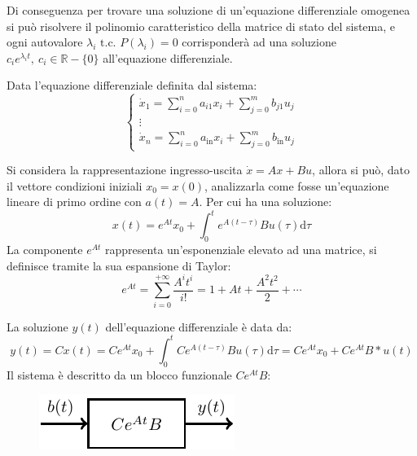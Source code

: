 \documentclass{article}
\numberwithin{equation}{subsection}
\newcommand{\df}{\mathrm{d}}
\begin{document}
Di conseguenza per trovare una soluzione di un'equazione differenziale omogenea si può risolvere il polinomio caratteristico della matrice di stato del sistema, e ogni 
autovalore $\lambda_i\mbox{ t.c. }P(\lambda_i)=0$ corrisponderà ad una soluzione $c_ie^{\lambda_it},\:c_i\in\mathbb{R}-\{0\}$ all'equazione differenziale. 


Data l'equazione differenziale definita dal sistema:
\begin{equation*}
    \begin{cases}
        \dot x_1=\displaystyle\sum_{i=0}^na_{i1}x_i+\sum_{j=0}^mb_{j1}u_j\\
        \vdots\\
        \dot x_n=\displaystyle\sum_{i=0}^na_\mathrm{in}x_i+\sum_{j=0}^mb_\mathrm{in}u_j
    \end{cases}
\end{equation*}

Si considera la rappresentazione ingresso-uscita $\dot x=Ax+Bu$, allora si può, dato il vettore condizioni iniziali $x_0=x(0)$, analizzarla come fosse un'equazione lineare 
di primo ordine con $a(t)=A$. Per cui ha una soluzione:
\begin{equation*}
    x(t)=e^{At}x_0+\displaystyle\int_{0}^te^{A(t-\tau)}Bu(\tau)\df\tau
\end{equation*} 
La componente $e^{At}$ rappresenta un'esponenziale elevato ad una matrice, si definisce tramite la sua espansione di Taylor: 
\begin{equation*}
    e^{At}=\displaystyle\sum_{i=0}^{+\infty}\frac{A^it^i}{i!}=1+At+\frac{A^2t^2}{2}+\cdots
\end{equation*}

La soluzione $y(t)$ dell'equazione differenziale è data da:
\begin{equation*}
    y(t)=Cx(t)=Ce^{At}x_0+\displaystyle\int_{0}^tCe^{A(t-\tau)}Bu(\tau)\df\tau=Ce^{At}x_0+Ce^{At}B*u(t)
\end{equation*}
Il sistema è descritto da un blocco funzionale $Ce^{At}B$:
\begin{figure}[H]%
    \centering
    \includegraphics{blocco-funzionale-4.pdf}%
\end{figure}
\end{document}
